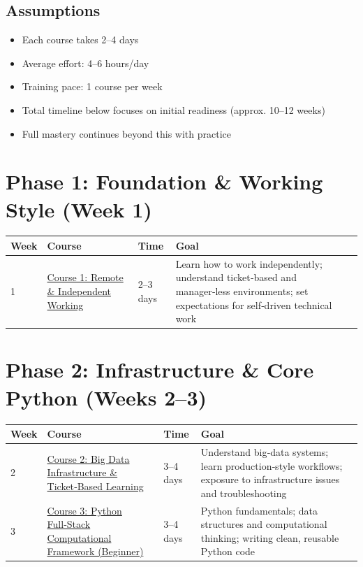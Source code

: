 \documentclass[12pt]{article}
\begin{document}
	\subsection*{Assumptions}
	\begin{itemize}
		\item Each course takes 2–4 days
		\item Average effort: 4–6 hours/day
		\item Training pace: 1 course per week
		\item Total timeline below focuses on initial readiness (approx. 10–12 weeks)
		\item Full mastery continues beyond this with practice
	\end{itemize}
	
	\vspace{0.5cm}
	
	\section*{Phase 1: Foundation \& Working Style (Week 1)}
	
	\begin{tabularx}{\textwidth}{|X|p{3cm}|p{3cm}|X|}
		\hline
		\textbf{Week} & \textbf{Course} & \textbf{Time} & \textbf{Goal} \\
		\hline
		1 & \href{https://www.udemy.com/course/remote-independent-working-in-a-managerless-environment-101/}{Course 1: Remote \& Independent Working} & 2–3 days & Learn how to work independently; understand ticket‑based and manager‑less environments; set expectations for self‑driven technical work \\
		\hline
	\end{tabularx}
	
	\vspace{0.3cm}
	
	\section*{ Phase 2: Infrastructure \& Core Python (Weeks 2–3)}
	
	\begin{tabularx}{\textwidth}{|X|p{3cm}|p{3cm}|X|}
		\hline
		\textbf{Week} & \textbf{Course} & \textbf{Time} & \textbf{Goal} \\
		\hline
		2 & \href{https://www.udemy.com/course/big-data-infra-admin-101-ticket-based-learning/}{Course 2: Big Data Infrastructure \& Ticket‑Based Learning} & 3–4 days & Understand big‑data systems; learn production‑style workflows; exposure to infrastructure issues and troubleshooting \\
		\hline
		3 & \href{https://www.udemy.com/course/python-full-stack-computational-framework-for-begineers-101/}{Course 3: Python Full‑Stack Computational Framework (Beginner)} & 3–4 days & Python fundamentals; data structures and computational thinking; writing clean, reusable Python code \\
		\hline
	\end{tabularx}
	
\end{document}
